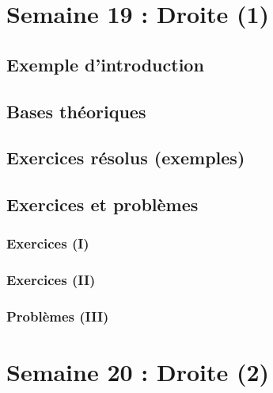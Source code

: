 \documentclass[
  12pt,
]{book}
\begin{document}
\hypertarget{semaine-19-droite-1}{%
\chapter{Semaine 19 : Droite (1)}\label{semaine-19-droite-1}}

\hypertarget{exemple-dintroduction-18}{%
\section{Exemple d'introduction}\label{exemple-dintroduction-18}}

\hypertarget{bases-thuxe9oriques-18}{%
\section{Bases théoriques}\label{bases-thuxe9oriques-18}}

\hypertarget{exercices-ruxe9solus-exemples-18}{%
\section{Exercices résolus (exemples)}\label{exercices-ruxe9solus-exemples-18}}

\hypertarget{exercices-et-probluxe8mes-18}{%
\section{Exercices et problèmes}\label{exercices-et-probluxe8mes-18}}

\hypertarget{exercices-i-18}{%
\subsection{Exercices (I)}\label{exercices-i-18}}

\hypertarget{exercices-ii-18}{%
\subsection{Exercices (II)}\label{exercices-ii-18}}

\hypertarget{probluxe8mes-iii-18}{%
\subsection{Problèmes (III)}\label{probluxe8mes-iii-18}}

\hypertarget{semaine-20-droite-2}{%
\chapter{Semaine 20 : Droite (2)}\label{semaine-20-droite-2}}
\end{document}
